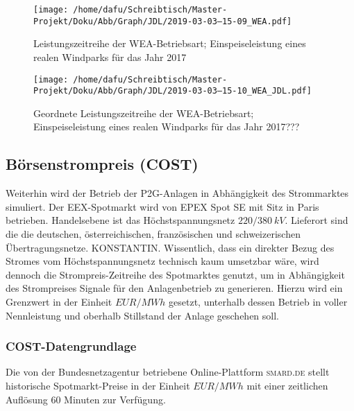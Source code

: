 \documentclass[onecolumn,10pt,titlepage]{article}
\begin{document}
\begin{figure}[H]
	\centering
	\begin{minipage}[t]{0.49\textwidth}
		\texttt{[image: /home/dafu/Schreibtisch/Master-Projekt/Doku/Abb/Graph/JDL/2019-03-03--15-09\_WEA.pdf]}
		
		\caption[Leistungszeitreihe der WEA-Betriebsart]{Leistungszeitreihe der WEA-Betriebsart; Einspeiseleistung eines realen Windparks für das Jahr 2017}
		\label{fig:WEA_roh_betrART} 
	\end{minipage}
	\hfill
	\begin{minipage}[t]{0.49\textwidth}
		\texttt{[image: /home/dafu/Schreibtisch/Master-Projekt/Doku/Abb/Graph/JDL/2019-03-03--15-10\_WEA\_JDL.pdf]}
		\caption[Geortnete Leistungszeitreihe der WEA-Betriebsart]{Geordnete Leistungszeitreihe der WEA-Betriebsart; Einspeiseleistung eines realen Windparks für das Jahr 2017???}
		\label{fig:WEA_JDL_betrART} 
	\end{minipage}
\end{figure}

\subsection{Börsenstrompreis (COST)}
Weiterhin wird der Betrieb der P2G-Anlagen in Abhängigkeit des Strommarktes simuliert. Der \textsc{EEX}-Spotmarkt wird von \textsc{EPEX} Spot SE mit Sitz in Paris betrieben. Handelsebene ist das Höchstspannungsnetz $220/380~kV$. Lieferort sind die die deutschen, österreichischen, französischen und schweizerischen Übertragungsnetze. KONSTANTIN.  Wissentlich, dass ein direkter Bezug des Stromes vom Höchstspannungsnetz technisch kaum umsetzbar wäre, wird dennoch die Strompreis-Zeitreihe des Spotmarktes genutzt, um in Abhängigkeit des Strompreises Signale für den Anlagenbetrieb zu generieren. Hierzu wird ein Grenzwert in der Einheit $EUR/MWh$ gesetzt, unterhalb dessen Betrieb in voller Nennleistung und oberhalb Stillstand der Anlage geschehen soll.
\subsubsection{COST-Datengrundlage}
Die von der Bundesnetzagentur betriebene Online-Plattform \textsc{smard.de} \cite{Bundesnetzagentur.31.Januar2019} stellt historische Spotmarkt-Preise in der Einheit $EUR/MWh$ mit einer zeitlichen Auflösung 60 Minuten zur Verfügung.
\end{document}
